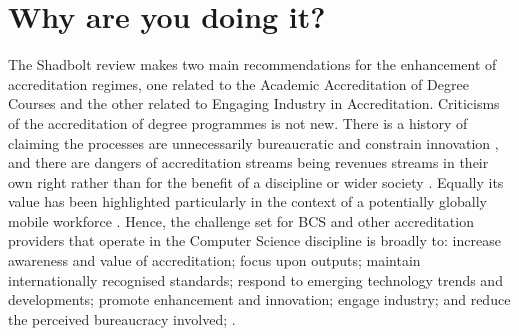 \documentclass[sigconf]{acmart}
\begin{document}
\section {Why are you doing it?}	
The Shadbolt review \cite[p.~8]{shadbolt2016shadbolt} makes two main recommendations for the enhancement of accreditation regimes, one related to the Academic Accreditation of Degree Courses and the other related to Engaging Industry in Accreditation. Criticisms of the accreditation of degree programmes is not new. There is a history of claiming the processes are unnecessarily bureaucratic and constrain  innovation \cite{Harvey2004},  and there are dangers of accreditation streams being revenues streams in their own right rather than for the benefit of a discipline or wider society \cite{Knight_2015}. Equally its value has been highlighted particularly in the context of a potentially globally mobile workforce \cite{Knight_2015}. Hence, the challenge set for BCS and other accreditation providers that operate in the Computer Science discipline is broadly to: increase awareness and value of accreditation; focus upon outputs; maintain internationally recognised standards;  respond to emerging technology trends and developments; promote enhancement and innovation; engage industry; and reduce the perceived bureaucracy involved; .

\begin{comment}

	"Recommendation 9 - Academic Accreditation of Degree Courses.
	
	BCS, IET and Tech Partnership should ensure that existing systems of degree course
	accreditation are flexible, agile, and enable HE providers to respond to changing
	demand and emerging technological trends and developments. Accreditation of courses
	should be focused on outputs. Accrediting bodies should work to increase awareness
	and value of accreditation so that it is valued by HE providers, students and employers,
	and consider how their role can provide a forum for engagement between HE and
	employers.

	Recommendation 10 - Engaging industry in accreditation.

	Employers, through employer groups, such as Tech Partnership, should engage more
	consistently with HE providers and BCS \& IET to ensure accreditation is effective and
	reflects current industry demand."
\end{comment} 
\end{document}
